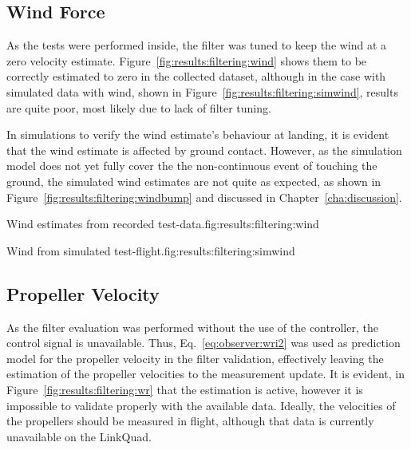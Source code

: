 \subsection{Wind Force}
    As the tests were performed inside, the filter was tuned to keep the
    wind at a zero velocity estimate.
    Figure~\ref{fig:results:filtering:wind} shows them to be correctly estimated to zero in the collected dataset,
    although in the case with simulated data with wind, shown in Figure~\ref{fig:results:filtering:simwind},
    results are quite poor, most likely due to lack of filter tuning.

    In simulations to verify the wind estimate's behaviour at landing, it
    is evident that the wind estimate is affected by ground contact.
    However, as the simulation model does not yet fully cover the the non-continuous
    event of touching the ground, the simulated wind estimates are not quite as expected, as shown in
    Figure~\ref{fig:results:filtering:windbump} and discussed in Chapter~\ref{cha:discussion}.

    \begin{subfigures}{Wind estimates from recorded test-data.}{fig:results:filtering:wind}
    \end{subfigures}

    \begin{subfigures}{Wind from simulated test-flight.}{fig:results:filtering:simwind}
    \end{subfigures}


\subsection{Propeller Velocity}
    As the filter evaluation was performed without the use of the controller,
    the control signal is unavailable. Thus, Eq.~\eqref{eq:observer:wri2} was used as
    prediction model for the propeller velocity in the filter validation, effectively leaving the estimation of the propeller velocities
    to the measurement update. It is evident, in Figure~\ref{fig:results:filtering:wr}
    that the estimation is active, however it is impossible to validate properly with the available data.
    Ideally, the velocities of the propellers should be measured in flight, although
    that data is currently unavailable on the LinkQuad.

